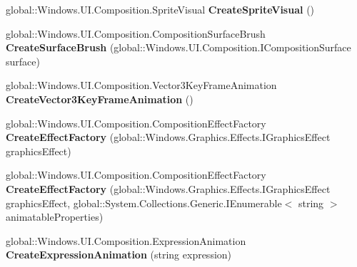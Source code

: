 \begin{DoxyCompactItemize}
\item 
\mbox{\label{interface_windows_1_1_u_i_1_1_composition_1_1_i_compositor_adcaefeb1c16a19b1a8bf373e365eab4e}} 
global\+::\+Windows.\+U\+I.\+Composition.\+Sprite\+Visual {\bfseries Create\+Sprite\+Visual} ()
\item 
\mbox{\label{interface_windows_1_1_u_i_1_1_composition_1_1_i_compositor_a9dce8b6100f7776e8c934df2a289924e}} 
global\+::\+Windows.\+U\+I.\+Composition.\+Composition\+Surface\+Brush {\bfseries Create\+Surface\+Brush} (global\+::\+Windows.\+U\+I.\+Composition.\+I\+Composition\+Surface surface)
\item 
\mbox{\label{interface_windows_1_1_u_i_1_1_composition_1_1_i_compositor_a7cda6336654224115f835339f7968fb1}} 
global\+::\+Windows.\+U\+I.\+Composition.\+Vector3\+Key\+Frame\+Animation {\bfseries Create\+Vector3\+Key\+Frame\+Animation} ()
\item 
\mbox{\label{interface_windows_1_1_u_i_1_1_composition_1_1_i_compositor_a741d4bb0d7eef4b99352ca5c3f31e3ab}} 
global\+::\+Windows.\+U\+I.\+Composition.\+Composition\+Effect\+Factory {\bfseries Create\+Effect\+Factory} (global\+::\+Windows.\+Graphics.\+Effects.\+I\+Graphics\+Effect graphics\+Effect)
\item 
\mbox{\label{interface_windows_1_1_u_i_1_1_composition_1_1_i_compositor_ad3ceab4f5a5f9bcd7b75ff2449c924f2}} 
global\+::\+Windows.\+U\+I.\+Composition.\+Composition\+Effect\+Factory {\bfseries Create\+Effect\+Factory} (global\+::\+Windows.\+Graphics.\+Effects.\+I\+Graphics\+Effect graphics\+Effect, global\+::\+System.\+Collections.\+Generic.\+I\+Enumerable$<$ string $>$ animatable\+Properties)
\item 
\mbox{\label{interface_windows_1_1_u_i_1_1_composition_1_1_i_compositor_a6edffff7da37deafae21b5d37ae75419}} 
global\+::\+Windows.\+U\+I.\+Composition.\+Expression\+Animation {\bfseries Create\+Expression\+Animation} (string expression)
\item 

\end{DoxyCompactItemize}
